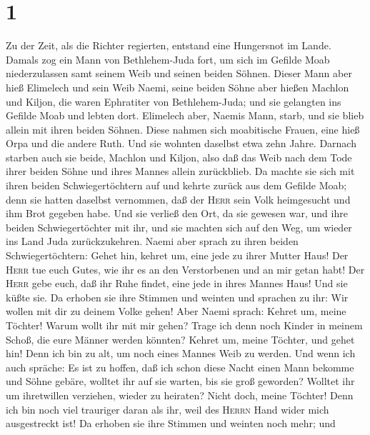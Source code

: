 \hypertarget{section}{%
\section{1}\label{section}}

 Zu der Zeit, als die Richter regierten, entstand eine
Hungersnot im Lande. Damals zog ein Mann von Bethlehem-Juda fort, um
sich im Gefilde Moab niederzulassen samt seinem Weib und seinen beiden
Söhnen.  Dieser Mann aber hieß Elimelech und sein Weib
Naemi, seine beiden Söhne aber hießen Machlon und Kiljon, die waren
Ephratiter von Bethlehem-Juda; und sie gelangten ins Gefilde Moab und
lebten dort.  Elimelech aber, Naemis Mann, starb, und sie
blieb allein mit ihren beiden Söhnen.  Diese nahmen sich
moabitische Frauen, eine hieß Orpa und die andere Ruth. Und sie wohnten
daselbst etwa zehn Jahre.  Darnach starben auch sie beide,
Machlon und Kiljon, also daß das Weib nach dem Tode ihrer beiden Söhne
und ihres Mannes allein zurückblieb.  Da machte sie sich
mit ihren beiden Schwiegertöchtern auf und kehrte zurück aus dem Gefilde
Moab; denn sie hatten daselbst vernommen, daß der \textsc{Herr} sein
Volk heimgesucht und ihm Brot gegeben habe.  Und sie
verließ den Ort, da sie gewesen war, und ihre beiden Schwiegertöchter
mit ihr, und sie machten sich auf den Weg, um wieder ins Land Juda
zurückzukehren.  Naemi aber sprach zu ihren beiden
Schwiegertöchtern: Gehet hin, kehret um, eine jede zu ihrer Mutter Haus!
Der \textsc{Herr} tue euch Gutes, wie ihr es an den Verstorbenen und an
mir getan habt!  Der \textsc{Herr} gebe euch, daß ihr Ruhe
findet, eine jede in ihres Mannes Haus! Und sie küßte sie.
 Da erhoben sie ihre Stimmen und weinten und sprachen zu
ihr: Wir wollen mit dir zu deinem Volke gehen!  Aber
Naemi sprach: Kehret um, meine Töchter! Warum wollt ihr mit mir gehen?
Trage ich denn noch Kinder in meinem Schoß, die eure Männer werden
könnten?  Kehret um, meine Töchter, und gehet hin! Denn
ich bin zu alt, um noch eines Mannes Weib zu werden. Und wenn ich auch
spräche: Es ist zu hoffen, daß ich schon diese Nacht einen Mann bekomme
und Söhne gebäre, wolltet ihr auf sie warten,  bis sie
groß geworden? Wolltet ihr um ihretwillen verziehen, wieder zu heiraten?
Nicht doch, meine Töchter! Denn ich bin noch viel trauriger daran als
ihr, weil des \textsc{Herrn} Hand wider mich ausgestreckt ist!
 Da erhoben sie ihre Stimmen und weinten noch mehr; und
